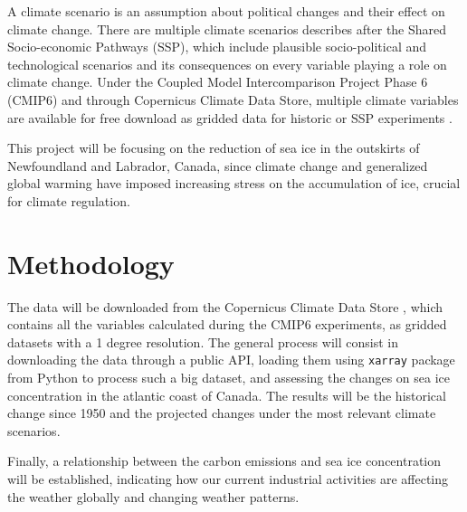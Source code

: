 \documentclass[letterpaper, 12pt]{article}
\begin{document}
A climate scenario is an assumption about political changes and their effect on climate change. There are multiple climate scenarios describes after the Shared Socio-economic Pathways (SSP), which include plausible socio-political and technological scenarios and its consequences on every variable playing a role on climate change. Under the Coupled Model Intercomparison Project Phase 6 (CMIP6) and through Copernicus Climate Data Store, multiple climate variables are available for free download as gridded data for historic or SSP experiments \parencite{cmip6_ca}.

This project will be focusing on the reduction of sea ice in the outskirts of Newfoundland and Labrador, Canada, since climate change and generalized global warming have imposed increasing stress on the accumulation of ice, crucial for climate regulation.


\section{Methodology}

The data will be downloaded from the Copernicus Climate Data Store \parencite{Copernicus_Climate_Change_Service2021-vo}, which contains all the variables calculated during the CMIP6 experiments, as gridded datasets with a 1 degree resolution. The general process will consist in downloading the data through a public API, loading them using \texttt{xarray} package from Python to process such a big dataset, and assessing the changes on sea ice concentration in the atlantic coast of Canada. The results will be the historical change since 1950 and the projected changes under the most relevant climate scenarios.

Finally, a relationship between the carbon emissions and sea ice concentration will be established, indicating how our current industrial activities are affecting the weather globally and changing weather patterns.




\printbibliography
\end{document}
